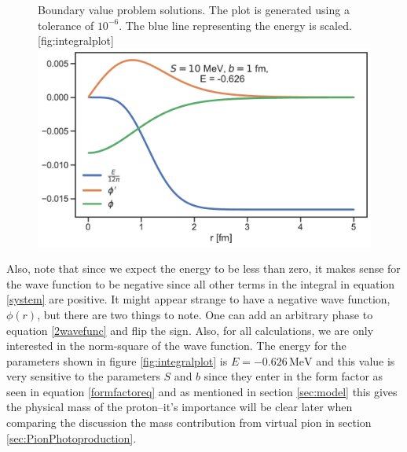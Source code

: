 \begin{figure}[H]
	\begin{sidecaption}{Boundary value problem solutions. The plot is generated using a tolerance of $10^{-6}$. The blue line representing the energy is scaled.}[fig:integralplot]
		\includegraphics[width=\linewidth]{Figures/Integralplot.pdf}
	\end{sidecaption}
\end{figure}
Also, note that since we expect the energy to be less than zero, it makes sense for the wave function to be negative since all other terms in the integral in equation \eqref{system} are positive. It might appear strange to have a negative wave function, $\phi(r)$, but there are two things to note. One can add an arbitrary phase to equation \eqref{2wavefunc} and flip the sign. Also, for all calculations, we are only interested in the norm-square of the wave function. The energy for the parameters shown in figure \ref{fig:integralplot} is $E = -0.626 \, \text{MeV}$ and this value is very sensitive to the parameters $S$ and $b$ since they enter in the form factor as seen in equation \eqref{formfactoreq} and as mentioned in section \ref{sec:model} this gives the physical mass of the proton--it's importance will be clear later when comparing the discussion the mass contribution from virtual pion in section \ref{sec:PionPhotoproduction}.

